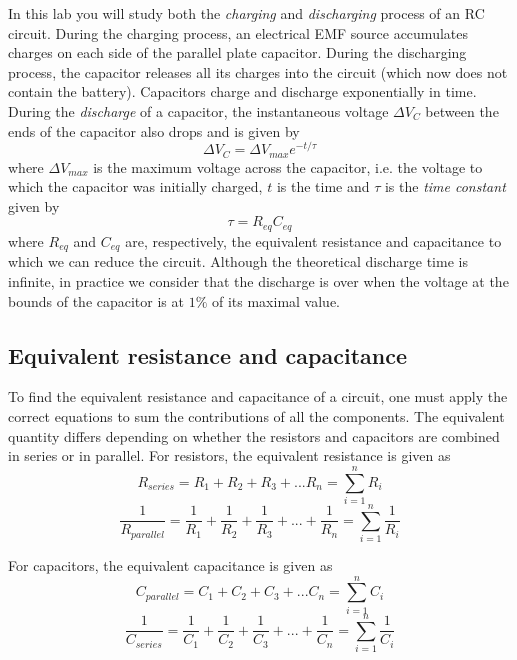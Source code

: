 \documentclass[12pt]{report}
\begin{document}
In this lab you will study both the \textit{charging} and \textit{discharging} process of an RC circuit. 
During the charging process, an electrical EMF source accumulates charges  on each side of the parallel plate capacitor.
During the discharging process, the capacitor releases all its charges into the circuit (which now does not contain the battery). 
Capacitors charge and discharge exponentially in time. 
During the \textit{discharge} of a capacitor, the instantaneous voltage $\Delta V_C$ between the ends of the capacitor also drops and is given by
\begin{equation}
\Delta V_C = \Delta V_{max} e^{-t/\tau}
\label{Eq:V-discharge}
\end{equation}
where $\Delta V_{max}$ is the maximum voltage across the capacitor, i.e. the voltage to which the capacitor was initially charged, $t$ is the time and $\tau$ is the \textit{time constant} given by
\begin{equation}
\tau = R_{eq} C_{eq}
\label{Eq:time-constant}
\end{equation}
where $R_{eq}$ and $C_{eq}$ are, respectively, the equivalent resistance and capacitance to which we can reduce the circuit. 
Although the theoretical discharge time is infinite, in practice we consider that the discharge is over when the voltage at the bounds of the capacitor is at $1\%$ of its maximal value. 

\subsection{Equivalent resistance and capacitance}
To find the equivalent resistance and capacitance of a circuit, one must apply the correct equations to sum the contributions of all the components. 
The equivalent quantity differs depending on whether the resistors and capacitors are combined in series or in parallel. For resistors, the equivalent resistance is given as
\begin{equation}
R_{series} = R_1 + R_2 + R_3 + ... R_n = \displaystyle \sum_{i=1}^n R_i
\end{equation}
\begin{equation}
\frac{1}{R_{parallel}} = \frac{1}{R_1} + \frac{1}{R_2} + \frac{1}{R_3} + ... + \frac{1}{R_n} = \displaystyle \sum_{i=1}^n \frac{1}{R_i}
\end{equation}

For capacitors, the equivalent capacitance is given as
\begin{equation}
C_{parallel} = C_1 + C_2 + C_3 + ... C_n = \displaystyle \sum_{i=1}^n C_i
\end{equation}
\begin{equation}
\frac{1}{C_{series}} =  \frac{1}{C_1} + \frac{1}{C_2} + \frac{1}{C_3} + ... + \frac{1}{C_n} = \displaystyle  \sum_{i=1}^n \frac{1}{C_i}
\end{equation}
\end{document}
